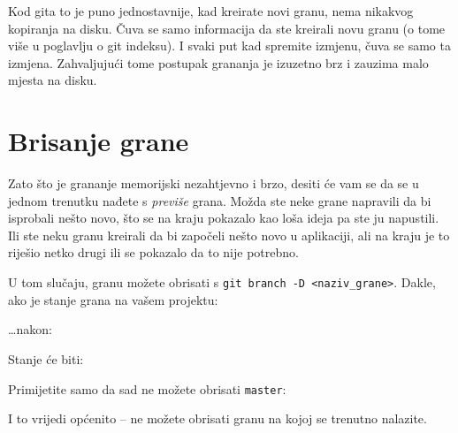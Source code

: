 Kod gita to je puno jednostavnije, kad kreirate novi granu, nema nikakvog kopiranja na disku. 
Čuva se samo informacija da ste kreirali novu granu (o tome više u poglavlju o git indeksu).
I svaki put kad spremite izmjenu, čuva se samo ta izmjena.
Zahvaljujući tome postupak grananja je izuzetno brz i zauzima malo mjesta na disku.

\section*{Brisanje grane}

Zato što je grananje memorijski nezahtjevno i brzo, desiti će vam se da se u jednom trenutku nađete s \emph{previše} grana.
Možda ste neke grane napravili da bi isprobali nešto novo, što se na kraju pokazalo kao loša ideja pa ste ju napustili.
Ili ste neku granu kreirali da bi započeli nešto novo u aplikaciji, ali na kraju je to riješio netko drugi ili se pokazalo da to nije potrebno.

U tom slučaju, granu možete obrisati s \verb+git branch -D <naziv_grane>+. 
Dakle, ako je stanje grana na vašem projektu:



\dots{}nakon:



Stanje će biti:



Primijetite samo da sad ne možete obrisati \verb+master+:



I to vrijedi općenito -- ne možete obrisati granu na kojoj se trenutno nalazite.


